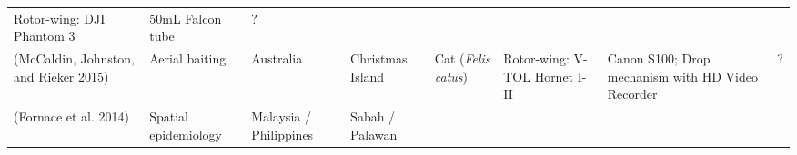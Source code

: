 \documentclass[]{interact}
\theoremstyle{plain}%
\theoremstyle{definition}
\theoremstyle{remark}
\begin{document}
\begin{longtable}[]{@{}llllllll@{}}
\begin{minipage}[t]{0.09\columnwidth}
Rotor-wing: DJI Phantom 3\strut
\end{minipage} & \begin{minipage}[t]{0.11\columnwidth}\raggedright\strut
50mL Falcon tube\strut
\end{minipage} & \begin{minipage}[t]{0.01\columnwidth}\raggedright\strut
?\strut
\end{minipage}\tabularnewline
\begin{minipage}[t]{0.11\columnwidth}\raggedright\strut
(McCaldin, Johnston, and Rieker 2015)\strut
\end{minipage} & \begin{minipage}[t]{0.18\columnwidth}\raggedright\strut
Aerial baiting\strut
\end{minipage} & \begin{minipage}[t]{0.03\columnwidth}\raggedright\strut
Australia\strut
\end{minipage} & \begin{minipage}[t]{0.14\columnwidth}\raggedright\strut
Christmas Island\strut
\end{minipage} & \begin{minipage}[t]{0.10\columnwidth}\raggedright\strut
Cat (\emph{Felis catus})\strut
\end{minipage} & \begin{minipage}[t]{0.09\columnwidth}\raggedright\strut
Rotor-wing: V-TOL Hornet I-II\strut
\end{minipage} & \begin{minipage}[t]{0.11\columnwidth}\raggedright\strut
Canon S100; Drop mechanism with HD Video Recorder\strut
\end{minipage} & \begin{minipage}[t]{0.01\columnwidth}\raggedright\strut
?\strut
\end{minipage}\tabularnewline
\begin{minipage}[t]{0.11\columnwidth}\raggedright\strut
(Fornace et al. 2014)\strut
\end{minipage} & \begin{minipage}[t]{0.18\columnwidth}\raggedright\strut
Spatial epidemiology\strut
\end{minipage} & \begin{minipage}[t]{0.03\columnwidth}\raggedright\strut
Malaysia / Philippines\strut
\end{minipage} & \begin{minipage}[t]{0.14\columnwidth}\raggedright\strut
Sabah / Palawan\strut
\end{minipage} & \begin{minipage}[t]{0.10\columnwidth}\raggedright\strut

\end{minipage}
\end{longtable}
\end{document}
